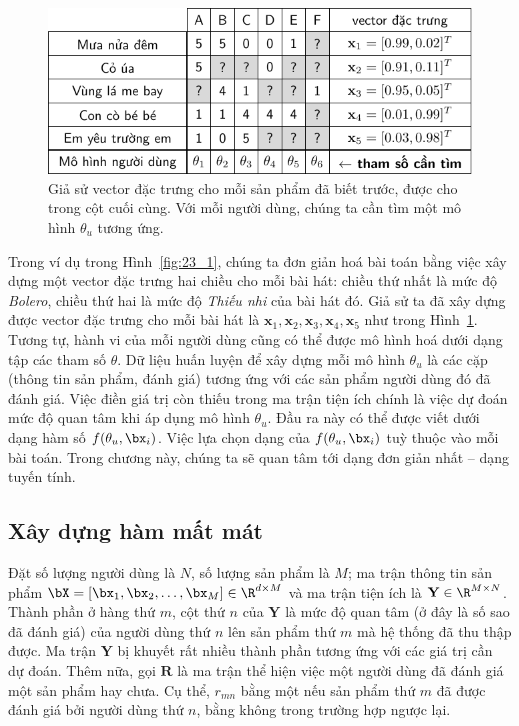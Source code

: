 \begin{figure}[t]
\centering
    \includegraphics[width = .8 \textwidth]{Chapters/06_RecommendationSystems/23_contentbasedrecommendersys/latex/contentbased.pdf}
    \caption[]{Giả sử vector đặc trưng cho mỗi sản phẩm đã biết trước, được cho trong cột cuối
    cùng. Với mỗi người dùng, chúng ta cần tìm một mô hình \(\theta_u\) tương
    ứng.}
    \label{fig:23_2}
\end{figure}
Trong ví dụ trong Hình~\ref{fig:23_1}, chúng ta đơn giản hoá bài toán bằng việc
xây dựng một vector đặc trưng hai chiều cho mỗi bài hát: chiều thứ nhất là mức
độ \textit{Bolero}, chiều thứ hai là mức độ \textit{Thiếu nhi} của bài hát đó.
Giả sử ta đã xây dựng được vector đặc trưng cho mỗi bài hát là $\mathbf{x}_1, \mathbf{x}_2,
\mathbf{x}_3, \mathbf{x}_4, \mathbf{x}_5$ như trong Hình~\ref{fig:23_2}. Tương
tự, hành vi của mỗi người dùng cũng có thể được mô hình hoá dưới dạng tập các
tham số $\theta$. Dữ liệu huấn luyện để xây dựng mỗi mô hình $\theta_u$ là các
cặp (thông tin sản phẩm, đánh giá) tương ứng với các sản phẩm người dùng đó đã đánh giá. Việc điền giá trị còn thiếu trong ma trận
tiện ích chính là việc dự đoán mức độ quan tâm khi áp dụng mô hình $\theta_u$. Đầu ra này có thể được viết dưới dạng hàm số $f(\theta_u,
\bx_i)$. Việc lựa chọn dạng của $f(\theta_u, \bx_i)$ tuỳ thuộc vào mỗi bài toán.
Trong chương này, chúng ta sẽ quan tâm tới dạng đơn giản nhất -- dạng tuyến tính.

 
\subsection{Xây dựng hàm mất mát}
 
Đặt số lượng người dùng là $N$, số lượng sản phẩm là $M$; ma
trận thông tin sản phẩm $\bX = [\bx_1, \bx_2, \dots, \bx_M] \in\R^{d\times M}$ và ma
trận tiện ích là $\mathbf{Y} \in \R^{M \times N}$. Thành phần ở hàng thứ $m$, cột
thứ $n$ của $\mathbf{Y}$ là {mức độ quan tâm} (ở đây là số sao đã
đánh giá) của người dùng thứ $n$ lên sản phẩm thứ $m$ mà hệ thống
đã thu
thập được. Ma trận $\mathbf{Y}$ bị khuyết rất nhiều thành phần tương ứng với các
giá trị cần dự đoán. Thêm nữa, gọi $\mathbf{R}$ là ma trận thể hiện việc một người dùng đã đánh giá một
sản phẩm hay chưa. Cụ thể, $r_{mn}$ bằng một nếu sản phẩm thứ $m$ đã
được đánh giá bởi người dùng thứ $n$, bằng không trong trường hợp ngược
lại. 

